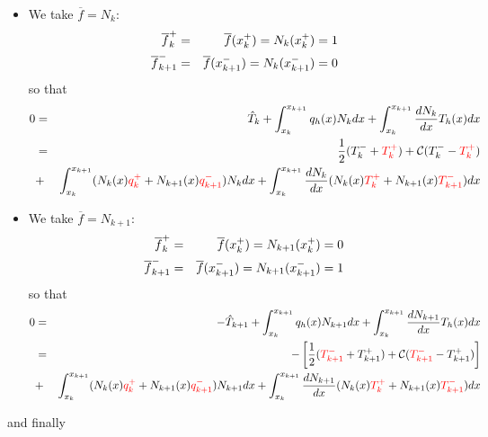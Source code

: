 \begin{itemize}
\begin{itemize}
\item We take $\overline{f}=N_k$: 
\begin{eqnarray}
\overline{f}_k^+&=&\overline{f}(x_k^+)= N_k(x_k^+) =1 \nonumber\\
\overline{f}_{k+1}^-&=&\overline{f}(x_{k+1}^-) = N_k(x_{k+1}^-) = 0\nonumber
\end{eqnarray}
so that 
\begin{eqnarray}
0
&=& \hat{T}_k     
+ \int_{x_k}^{x_{k+1}}  q_h(x) N_k dx
+ \int_{x_k}^{x_{k+1}} \frac{dN_k}{dx} T_h(x) dx  \nonumber\\
&=& 
\frac{1}{2}(T_k^-+{\color{red}T_k^+}) + {\cal C} (T_k^- - {\color{red}T_k^+}) \nonumber\\
&+& \int_{x_k}^{x_{k+1}}  (N_k(x) {\color{red}q_k^+} + N_{k+1}(x) {\color{red}q_{k+1}^-}) N_k dx
+ \int_{x_k}^{x_{k+1}} \frac{dN_k}{dx} (N_k(x) {\color{red}T_k^+} + N_{k+1}(x) {\color{red}T_{k+1}^-})   dx 
\label{eq:dg5}
\end{eqnarray}

\item We take $\overline{f}=N_{k+1}$:
\begin{eqnarray}
\overline{f}_k^+&=&\overline{f}(x_k^+) = N_{k+1}(x_k^+) = 0 \nonumber\\
\overline{f}_{k+1}^-&=&\overline{f}(x_{k+1}^-) = N_{k+1}(x_{k+1}^-) =1 \nonumber
\end{eqnarray}
so that 
\begin{eqnarray}
0
&=& -\hat{T}_{k+1} 
+ \int_{x_k}^{x_{k+1}}  q_h(x) N_{k+1} dx
+ \int_{x_k}^{x_{k+1}} \frac{dN_{k+1} }{dx} T_h(x) dx  \nonumber\\
&=&-\left[\frac{1}{2}({\color{red}T_{k+1}^-}+T_{k+1}^+) + {\cal C}({\color{red}T_{k+1}^-} -T_{k+1}^+)\right]\\
&+& \int_{x_k}^{x_{k+1}} (N_k(x) {\color{red}q_k^+} + N_{k+1}(x) {\color{red}q_{k+1}^-})  N_{k+1} dx
+ \int_{x_k}^{x_{k+1}} \frac{dN_{k+1} }{dx} (N_k(x) {\color{red} T_k^+} + N_{k+1}(x) {\color{red}T_{k+1}^-}) dx 
\label{eq:dg7}
\end{eqnarray}



 
\end{itemize}

and finally 


\end{itemize}
